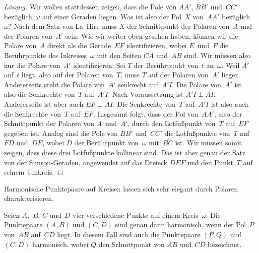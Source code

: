 \begin{proof}[Lösung]
	Wir wollen stattdessen zeigen, dass die Pole von $AA'$, $BB'$ und~$CC'$ bezüglich~$\omega$ auf einer Geraden liegen. Was ist also der Pol~$X$ von~$AA'$ bezüglich~$\omega$? Nach dem Satz von La~Hire muss $X$ der Schnittpunkt der Polaren von~$A$ und der Polaren von~$A'$ sein. Wie wir weiter oben gesehen haben, können wir die Polare von~$A$ direkt als die Gerade~$EF$ identifizieren, wobei $E$~und~$F$ die Berührpunkte des Inkreises~$\omega$ mit den Seiten $\overline{CA}$ und~$\overline{AB}$ sind. Wir müssen also nur die Polare von~$A'$ identifizieren. Sei $T$ der Berührpunkt von~$t$ an~$\omega$. Weil $A'$ auf~$t$ liegt, also auf der Polaren von~$T$, muss $T$ auf der Polaren von~$A'$ liegen. Andererseits steht die Polare von~$A'$ senkrecht auf~$A'I$. Die Polare von~$A'$ ist also die Senkrechte von~$T$ auf~$A'I$. Nach Voraussetzung ist $A'I\perp AI$. Andererseits ist aber auch $EF\perp AI$. Die Senkrechte von~$T$ auf~$A'I$ ist also auch die Senkrechte von~$T$ auf~$EF$. Insgesamt folgt, dass der Pol von~$AA'$, also der Schnittpunkt der Polaren von $A$~und~$A'$, durch den Lotfußpunkt von~$T$ auf~$EF$ gegeben ist. Analog sind die Pole von $BB'$ und~$CC'$ die Lotfußpunkte von~$T$ auf $FD$ und~$DE$, wobei $D$ der Berührpunkt von~$\omega$ mit~$\overline{BC}$ ist. Wir müssen somit zeigen, dass diese drei Lotfußpunkte kollinear sind. Das ist aber genau der Satz von der Simson-Geraden, angewendet auf das Dreieck $DEF$ und den Punkt~$T$ auf seinem Umkreis.
\end{proof}

Harmonische Punktepaare auf Kreisen lassen sich sehr elegant durch Polaren charakterisieren.

\begin{satzmitnamen}[Lemma]
	Seien $A$,~$B$, $C$ und~$D$ vier verschiedene Punkte auf einem Kreis~$\omega$. Die Punktepaare $(A,B)$ und $(C,D)$ sind genau dann harmonisch, wenn der Pol~\(P\) von~$AB$ auf~$CD$ liegt. In diesem Fall sind auch die Punktepaare $(P,Q)$ und $(C,D)$ harmonisch, wobei $Q$ den Schnittpunkt von $AB$ und~$CD$ bezeichnet.
\end{satzmitnamen}

